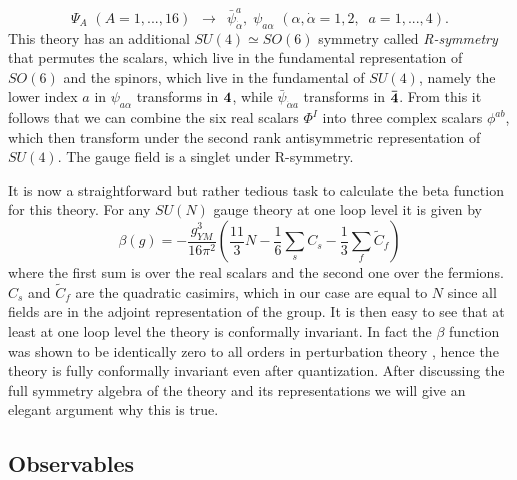 \begin{equation}
	\Psi_A \, \, (A = 1, ..., 16) \, \, \, \rightarrow \, \, \,  \bar{\psi}^a_{\dot{\alpha}}, \; \psi_{a\alpha} \, \, (\alpha, \dot{\alpha} = 1, 2, \; \; a = 1, ..., 4).
\end{equation}
This theory has an additional $SU(4) \simeq SO(6)$ symmetry called \emph{R-symmetry} that permutes the scalars, which live in the fundamental representation of $SO(6)$ and the spinors, which live in the fundamental of $SU(4)$, namely the lower index $a$ in $\psi_{a\alpha}$ transforms in ${\bf 4}$, while $\bar{\psi}_{\dot{\alpha}a}$ transforms in ${\bf \bar{4}}$. 
From this it follows that we can combine the six real scalars $\Phi^I$ into three complex scalars $\phi^{ab}$, which then transform under the second rank antisymmetric representation of $SU(4)$. 
The gauge field is a singlet under R-symmetry.

It is now a straightforward but rather tedious task to calculate the beta function for this theory. 
For any $SU(N)$ gauge theory at one loop level it is given by \cite{Gross:1973}
\begin{equation}
	\beta(g) = - \frac{g_{YM}^3}{16\pi^2} \left( \frac{11}{3} N - \frac{1}{6} \sum_s C_s - \frac{1}{3} \sum_f \tilde{C}_f \right)
\end{equation}
where the first sum is over the real scalars and the second one over the fermions. 
$C_s$ and $\tilde{C}_f$ are the quadratic casimirs, which in our case are equal to $N$ since all fields are in the adjoint representation of the group. 
It is then easy to see that at least at one loop level the theory is conformally invariant. 
In fact the $\beta$ function was shown to be identically zero to all orders in perturbation theory \cite{Mandelstam:1983, Brink:1983}, hence the theory is fully conformally invariant even after quantization. 
After discussing the full symmetry algebra of the theory and its representations we will give an elegant argument why this is true.

\subsection{Observables}

